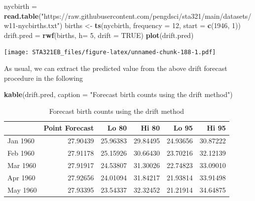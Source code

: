 \documentclass[
]{book}
\newenvironment{Shaded}{\begin{snugshade}}{\end{snugshade}}
\newcommand{\AttributeTok}[1]{\textcolor[rgb]{0.13,0.29,0.53}{#1}}
\newcommand{\ConstantTok}[1]{\textcolor[rgb]{0.56,0.35,0.01}{#1}}
\newcommand{\DecValTok}[1]{\textcolor[rgb]{0.00,0.00,0.81}{#1}}
\newcommand{\FunctionTok}[1]{\textcolor[rgb]{0.13,0.29,0.53}{\textbf{#1}}}
\newcommand{\NormalTok}[1]{#1}
\newcommand{\OtherTok}[1]{\textcolor[rgb]{0.56,0.35,0.01}{#1}}
\newcommand{\StringTok}[1]{\textcolor[rgb]{0.31,0.60,0.02}{#1}}
\begin{document}
\begin{Shaded}
\begin{Highlighting}[]
\NormalTok{nycbirth }\OtherTok{=} \FunctionTok{read.table}\NormalTok{(}\StringTok{"https://raw.githubusercontent.com/pengdsci/sta321/main/datasets/w11{-}nycbirths.txt"}\NormalTok{)}
\NormalTok{births }\OtherTok{\textless{}{-}} \FunctionTok{ts}\NormalTok{(nycbirth, }\AttributeTok{frequency =} \DecValTok{12}\NormalTok{, }\AttributeTok{start =} \FunctionTok{c}\NormalTok{(}\DecValTok{1946}\NormalTok{, }\DecValTok{1}\NormalTok{))}
\NormalTok{drift.pred }\OtherTok{=} \FunctionTok{rwf}\NormalTok{(births, }\AttributeTok{h=} \DecValTok{5}\NormalTok{, }\AttributeTok{drift =} \ConstantTok{TRUE}\NormalTok{)}
\FunctionTok{plot}\NormalTok{(drift.pred)}
\end{Highlighting}
\end{Shaded}

\texttt{[image: STA321EB\_files/figure-latex/unnamed-chunk-188-1.pdf]}

As usual, we can extract the predicted value from the above drift forecast procedure in the following

\begin{Shaded}
\begin{Highlighting}[]
\FunctionTok{kable}\NormalTok{(drift.pred, }\AttributeTok{caption =} \StringTok{"Forecast birth counts using the drift method"}\NormalTok{)}
\end{Highlighting}
\end{Shaded}

\begin{table}

\caption{\label{tab:unnamed-chunk-189}Forecast birth counts using the drift method}
\centering
\begin{tabular}[t]{l|r|r|r|r|r}
\hline
  & Point Forecast & Lo 80 & Hi 80 & Lo 95 & Hi 95\\
\hline
Jan 1960 & 27.90439 & 25.96383 & 29.84495 & 24.93656 & 30.87222\\
\hline
Feb 1960 & 27.91178 & 25.15926 & 30.66430 & 23.70216 & 32.12139\\
\hline
Mar 1960 & 27.91917 & 24.53807 & 31.30026 & 22.74823 & 33.09010\\
\hline
Apr 1960 & 27.92656 & 24.01094 & 31.84217 & 21.93814 & 33.91498\\
\hline
May 1960 & 27.93395 & 23.54337 & 32.32452 & 21.21914 & 34.64875\\
\hline
\end{tabular}
\end{table}
\end{document}
